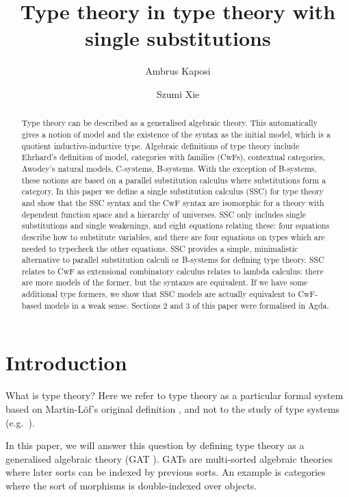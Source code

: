 \documentclass[a4paper,UKenglish,cleveref, autoref, thm-restate]{lipics-v2021}
\title{Type theory in type theory with single substitutions}
\author{Ambrus Kaposi}{Eötvös Loránd University (ELTE), Hungary}{akaposi@inf.elte.hu}{https://orcid.org/0000-0001-9897-8936}{}
\author{Szumi Xie}{Eötvös Loránd University (ELTE), Hungary}{szumi@inf.elte.hu}{https://orcid.org/0009-0001-1355-1114}{}
\begin{document}
\maketitle

\begin{abstract}
Type theory can be described as a generalised algebraic theory. This
automatically gives a notion of model and the existence of the syntax
as the initial model, which is a quotient inductive-inductive
type. Algebraic definitions of type theory include Ehrhard's
definition of model, categories with families (CwFs), contextual
categories, Awodey's natural models, C-systems, B-systems. With the
exception of B-systems, these notions are based on a parallel
substitution calculus where substitutions form a category. In this
paper we define a single substitution calculus (SSC) for type theory
and show that the SSC syntax and the CwF syntax are isomorphic for a
theory with dependent function space and a hierarchy of universes. SSC
only includes single substitutions and single weakenings, and eight
equations relating these: four equations describe how to substitute
variables, and there are four equations on types which are needed to
typecheck the other equations. SSC provides a simple, minimalistic
alternative to parallel substitution calculi or B-systems for defining
type theory. SSC relates to CwF as extensional combinatory calculus
relates to lambda calculus: there are more models of the former, but
the syntaxes are equivalent. If we have some additional type formers,
we show that SSC models are actually equivalent to CwF-based models in
a weak sense. Sections 2 and 3 of this paper were formalised in Agda.
\end{abstract}

\section{Introduction}

What is type theory? Here we refer to type theory as a particular
formal system based on Martin-Löf's original definition
\cite{martinlof73predicative}, and not to the study of type systems
(e.g.\ \cite{DBLP:books/daglib/0005958}).

In this paper, we will answer this question by defining type theory as
a generalised algebraic theory (GAT
\cite{DBLP:journals/apal/Cartmell86}). GATs are multi-sorted algebraic
theories where later sorts can be indexed by previous sorts. An
example is categories where the sort of morphisms is double-indexed
over objects.
\end{document}
